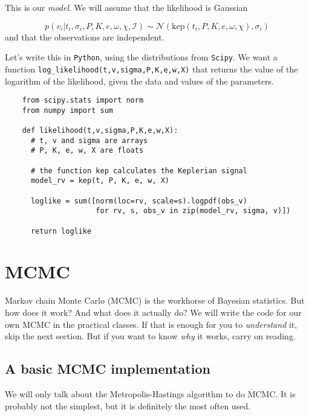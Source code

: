 \documentclass[a4paper,11pt]{article}
\begin{document}
  \noindent This is our \emph{model}.
  We will assume that the likelihood is Gaussian

  \begin{equation}
    p(v_i|t_i,\sigma_i, P,K,e,\omega,\chi, \mathcal{I}) \sim \mathcal{N}(\text{kep}(t_i,P,K,e,\omega,\chi), \sigma_i)
  \end{equation}
  and that the observations are independent.

  Let's write this in \texttt{Python}, using the distributions from \texttt{Scipy}.
  We want a function \texttt{log\_likelihood(t,v,sigma,P,K,e,w,X)} that returns the value of the logarithm of the likelihood, given the data and values of the parameters.
  \newpage

  \begin{verbatim}
    from scipy.stats import norm
    from numpy import sum

    def likelihood(t,v,sigma,P,K,e,w,X):
      # t, v and sigma are arrays
      # P, K, e, w, X are floats

      # the function kep calculates the Keplerian signal
      model_rv = kep(t, P, K, e, w, X)

      loglike = sum([norm(loc=rv, scale=s).logpdf(obs_v) 
                     for rv, s, obs_v in zip(model_rv, sigma, v)])

      return loglike
  \end{verbatim}





\newpage
\section{MCMC}

Markov chain Monte Carlo (MCMC) is the workhorse of Bayesian statistics.
But how does it work? 
And what does it actually do?
We will write the code for our own MCMC in the practical classes.
If that is enough for you to \emph{understand} it, skip the next section.
But if you want to know \emph{why} it works, carry on reading.


\subsection{A basic MCMC implementation}

We will only talk about the Metropolis-Hastings algorithm to do MCMC.
It is probably not the simplest, but it is definitely the most often used.
\end{document}

